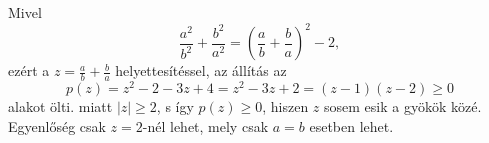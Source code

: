    Mivel
   $$
      \frac{a^2}{b^2}+\frac{b^2}{a^2}=\left( \frac{a}{b}+\frac{b}{a} \right)^2 -2 ,
   $$
   ezért a $z=\frac{a}{b}+\frac{b}{a}$ helyettesítéssel, az állítás az
   $$
      p(z)=z^2-2-3z+4=z^2-3z+2=(z-1)(z-2) \ge 0
   $$
   alakot ölti.  miatt $|z| \ge 2$, s így
   $p(z)\ge 0$, hiszen $z$ sosem esik a gyökök közé. Egyenlőség csak 
   $z=2$-nél lehet, mely csak $a=b$ esetben lehet.
